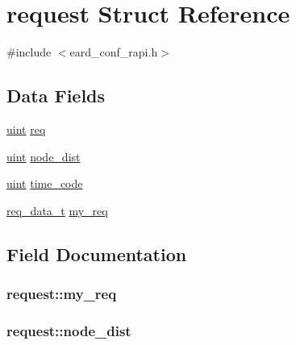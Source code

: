 \hypertarget{structrequest}{}\section{request Struct Reference}
\label{structrequest}


{\ttfamily \#include $<$eard\+\_\+conf\+\_\+rapi.\+h$>$}

\subsection*{Data Fields}
\begin{DoxyCompactItemize}
\item 
\hyperlink{generic_8h_a91ad9478d81a7aaf2593e8d9c3d06a14}{uint} \hyperlink{structrequest_a876777560756f3c5dd530a47168cae79}{req}
\item 
\hyperlink{generic_8h_a91ad9478d81a7aaf2593e8d9c3d06a14}{uint} \hyperlink{structrequest_a37f1531c9b39da65d6756a37f93937de}{node\+\_\+dist}
\item 
\hyperlink{generic_8h_a91ad9478d81a7aaf2593e8d9c3d06a14}{uint} \hyperlink{structrequest_a44011d84573829de2aad5a0e201bbee0}{time\+\_\+code}
\item 
\hyperlink{eard__conf__rapi_8h_a8e11ed6a146d5be9a0067ef5b147b5fb}{req\+\_\+data\+\_\+t} \hyperlink{structrequest_a5450814d1f085239f22a19900f6c0e96}{my\+\_\+req}
\end{DoxyCompactItemize}


\subsection{Field Documentation}
\subsubsection[{\texorpdfstring{my\+\_\+req}{my_req}}]{ request\+::my\+\_\+req}\hypertarget{structrequest_a5450814d1f085239f22a19900f6c0e96}{}\label{structrequest_a5450814d1f085239f22a19900f6c0e96}
\subsubsection[{\texorpdfstring{node\+\_\+dist}{node_dist}}]{ request\+::node\+\_\+dist}\hypertarget{structrequest_a37f1531c9b39da65d6756a37f93937de}{}\label{structrequest_a37f1531c9b39da65d6756a37f93937de}
